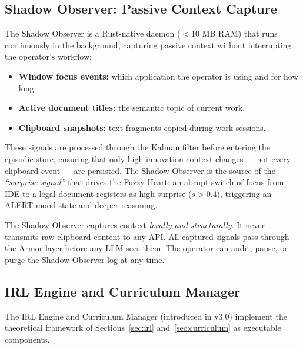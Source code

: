\documentclass[12pt,a4paper]{article}
\begin{document}
\subsection{Shadow Observer: Passive Context Capture}

The Shadow Observer is a Rust-native daemon ($<$10 MB RAM) that runs continuously in the
background, capturing passive context without interrupting the operator's workflow:

\begin{itemize}[leftmargin=*, itemsep=2pt]
  \item \textbf{Window focus events:} which application the operator is using and for how long.
  \item \textbf{Active document titles:} the semantic topic of current work.
  \item \textbf{Clipboard snapshots:} text fragments copied during work sessions.
\end{itemize}

These signals are processed through the Kalman filter before entering the episodic store,
ensuring that only high-innovation context changes --- not every clipboard event --- are
persisted. The Shadow Observer is the source of the \emph{``surprise signal''} that drives the
Fuzzy Heart: an abrupt switch of focus from IDE to a legal document registers as high surprise
($s > 0.4$), triggering an ALERT mood state and deeper reasoning.

\begin{tcolorbox}[defbox, title={Privacy Note}]
The Shadow Observer captures context \emph{locally and structurally}. It never transmits
raw clipboard content to any API. All captured signals pass through the Armor layer before
any LLM sees them. The operator can audit, pause, or purge the Shadow Observer log at any time.
\end{tcolorbox}

\subsection{IRL Engine and Curriculum Manager}
\label{sec:irlengine}

The IRL Engine and Curriculum Manager (introduced in v3.0) implement the theoretical
framework of Sections~\ref{sec:irl} and~\ref{sec:curriculum} as executable components.
\end{document}

